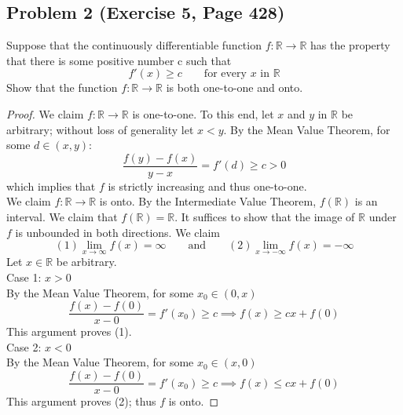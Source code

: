 \documentclass{article}
\begin{document}
\subsection*{Problem 2 (Exercise 5, Page 428)}
Suppose that the continuously differentiable function $f \colon \mathbb{R} \to \mathbb{R}$ has the property that there is some positive number c such that 
\[ f'(x) \geq c \qquad \text{for every $x$ in $\mathbb{R}$}\]
Show that the function $f \colon \mathbb{R} \to \mathbb{R}$ is both one-to-one and onto.
\begin{proof} 
We claim $f \colon \mathbb{R} \to \mathbb{R}$ is one-to-one. To this end, let $x$ and $y$ in $\mathbb{R}$ be arbitrary; without loss of generality let $x < y$. By the Mean Value Theorem, for some $d \in (x, y)$:
\[\frac{f(y) - f(x)}{y - x} = f'(d) \geq c > 0 \]
which implies that $f$ is strictly increasing and thus one-to-one. \\
We claim $f \colon \mathbb{R} \to \mathbb{R}$ is onto. By the Intermediate Value Theorem, $f(\mathbb{R})$ is an interval. We claim that $f(\mathbb{R}) = \mathbb{R}$. It suffices to show that the image of $\mathbb{R}$ under $f$ is unbounded in both directions. We claim
\[ (1) \lim_{x \to \infty} f(x) = \infty \qquad \text{and} \qquad (2) \lim_{x \to -\infty} f(x) = -\infty\]
Let $x \in \mathbb{R}$ be arbitrary. \\
Case 1: $x > 0$ \\
By the Mean Value Theorem, for some $x_0 \in (0, x)$
\[ \frac{f(x) - f(0)}{x - 0} = f'(x_0) \geq c \implies f(x) \geq cx + f(0)\]
This argument proves (1). \\
Case 2: $x < 0$ \\
By the Mean Value Theorem, for some $x_0 \in (x, 0)$
\[ \frac{f(x) - f(0)}{x - 0} = f'(x_0) \geq c \implies f(x) \leq cx + f(0)\]
This argument proves (2); thus $f$ is onto.
\end{proof}
\end{document}
